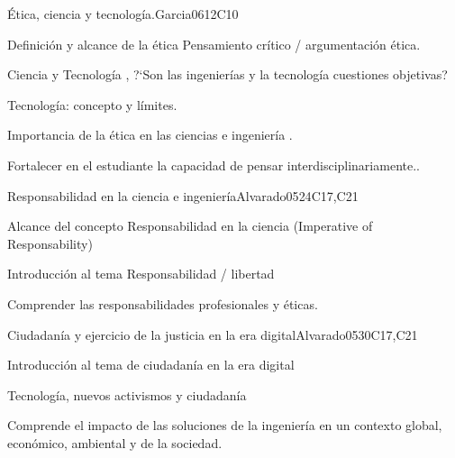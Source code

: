 \begin{syllabus}
\begin{unit}{Ética, ciencia y tecnología.}{}{Garcia06}{12}{C10}
   \begin{topics}
      \item Definición y alcance de la ética Pensamiento crítico /  argumentación ética.
      \item Ciencia y Tecnología , ?`Son las ingenierías y la tecnología cuestiones objetivas? 
      \item Tecnología: concepto y límites.
      \item Importancia de la ética en las ciencias e ingeniería .
   \end{topics}
   \begin{learningoutcomes}
      \item Fortalecer en el estudiante la capacidad de pensar interdisciplinariamente..
   \end{learningoutcomes}
\end{unit}

\begin{unit}{Responsabilidad en la ciencia e ingeniería}{}{Alvarado05}{24}{C17,C21}
   \begin{topics}
      \item Alcance del concepto  Responsabilidad en la ciencia (Imperative of Responsability)
      \item Introducción al tema Responsabilidad / libertad 
      \end{topics}

   \begin{learningoutcomes}
      \item  Comprender las responsabilidades profesionales y éticas.
   \end{learningoutcomes}
\end{unit}

\begin{unit}{Ciudadanía y ejercicio de la justicia en la era digital}{}{Alvarado05}{30}{C17,C21}
   \begin{topics}
      \item Introducción al tema de ciudadanía en la era digital
      \item Tecnología,  nuevos activismos y ciudadanía
   \end{topics}

   \begin{learningoutcomes}
      \item Comprende el impacto de las soluciones de la ingeniería en un contexto global, económico, ambiental y de la sociedad.
   \end{learningoutcomes}
\end{unit}

\begin{coursebibliography}
\end{coursebibliography}

\end{syllabus}
